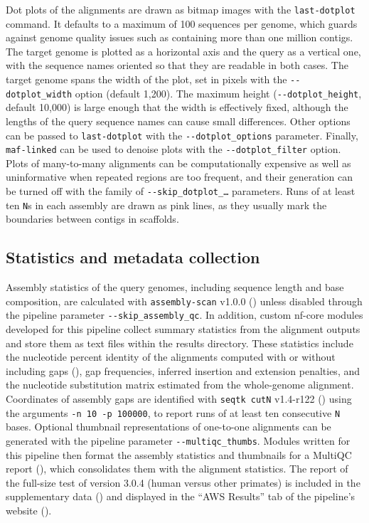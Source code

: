 \documentclass[PCJ,Unicode,screen]{cedram}
\begin{document}
Dot plots of the alignments are drawn as bitmap images with the \verb|last-dotplot| command. It defaults to a maximum of 100 sequences per genome, which guards against genome quality issues such as containing more than one million contigs. The target genome is plotted as a horizontal axis and the query as a vertical one, with the sequence names oriented so that they are readable in both cases. The target genome spans the width of the plot, set in pixels with the \verb|--dotplot_width| option (default 1,200). The maximum height (\verb|--dotplot_height|, default 10,000) is large enough that the width is effectively fixed, although the lengths of the query sequence names can cause small differences. Other options can be passed to \verb|last-dotplot| with the \verb|--dotplot_options| parameter.  Finally, \verb|maf-linked| can be used to denoise plots with the \verb|--dotplot_filter| option.  Plots of many-to-many alignments can be computationally expensive as well as uninformative when repeated regions are too frequent, and their generation can be turned off with the family of \verb|--skip_dotplot_…| parameters. Runs of at least ten \verb|N|s in each assembly are drawn as pink lines, as they usually mark the boundaries between contigs in scaffolds.

\subsection*{Statistics and metadata collection}

Assembly statistics of the query genomes, including sequence length and base composition, are calculated with \texttt{assembly-scan} v1.0.0 (\cite{Petit_2023}) unless disabled through the pipeline parameter \verb|--skip_assembly_qc|. In addition, custom nf-core modules developed for this pipeline collect summary statistics from the alignment outputs and store them as text files within the results directory. These statistics include the nucleotide percent identity of the alignments computed with or without including gaps (\cite{May_2004}), gap frequencies, inferred insertion and extension penalties, and the nucleotide substitution matrix estimated from the whole-genome alignment. Coordinates of assembly gaps are identified with \texttt{seqtk cutN} v1.4-r122 (\cite{Li_2013}) using the arguments \texttt{-n 10 -p 100000}, to report runs of at least ten consecutive \texttt{N} bases. Optional thumbnail representations of one-to-one alignments can be generated with the pipeline parameter \verb|--multiqc_thumbs|. Modules written for this pipeline then format the assembly statistics and thumbnails for a MultiQC report (\cite{Ewels_2016}), which consolidates them with the alignment statistics. The report of the full-size test of version 3.0.4 (human versus other primates) is included in the supplementary data (\cite{pairgenomealign_paper_data}) and displayed in the ``AWS Results'' tab of the pipeline's website (\cite{nfcore_pairgenomealign_aws_304}).
\end{document}

